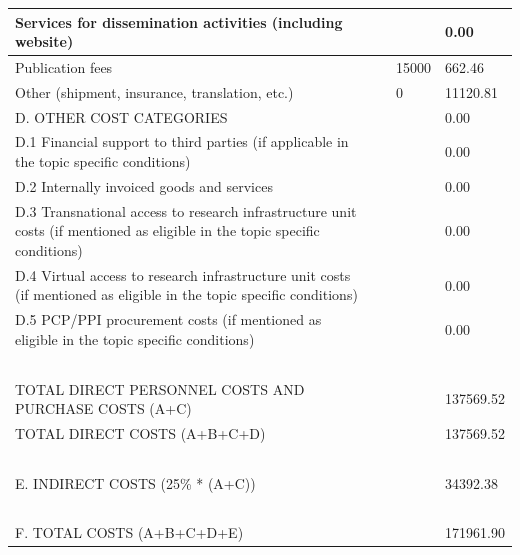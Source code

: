 \begin{table}[H]
\begin{tabular}{|l|l|l|l|}
Services for dissemination activities (including website) & ~ & ~ & 0.00 \\ \hline
Publication fees & ~ & 15000 & 662.46 \\ \hline
Other (shipment, insurance, translation, etc.) & ~ & 0 & 11120.81 \\ \hline
D. OTHER COST CATEGORIES & ~ & ~ & 0.00\\ \hline
D.1 Financial support to third parties (if applicable in the topic specific conditions) & ~ & ~ & 0.00 \\ \hline
D.2 Internally invoiced goods and services & ~ & ~ & 0.00 \\ \hline
D.3 Transnational access to research infrastructure unit costs (if mentioned as eligible in the topic specific conditions) & ~ & ~ & 0.00 \\ \hline
D.4 Virtual access to research infrastructure unit costs (if mentioned as eligible in the topic specific conditions) & ~ & ~ & 0.00 \\ \hline
D.5 PCP/PPI procurement costs (if mentioned as eligible in the topic specific conditions) & ~ & ~ & 0.00 \\ \hline
~ & ~ & ~ & ~ \\ \hline
TOTAL DIRECT PERSONNEL COSTS AND PURCHASE COSTS (A+C) & ~ & ~ & 137569.52 \\ \hline
TOTAL DIRECT COSTS (A+B+C+D) & ~ & ~ & 137569.52 \\ \hline
~ & ~ & ~ & ~ \\ \hline
E. INDIRECT COSTS (25\% * (A+C)) & ~ & ~ & 34392.38 \\ \hline
~ & ~ & ~ & ~ \\ \hline
F. TOTAL COSTS (A+B+C+D+E) & ~ & ~ & 171961.90 \\ \hline
\end{tabular}
\end{table}

